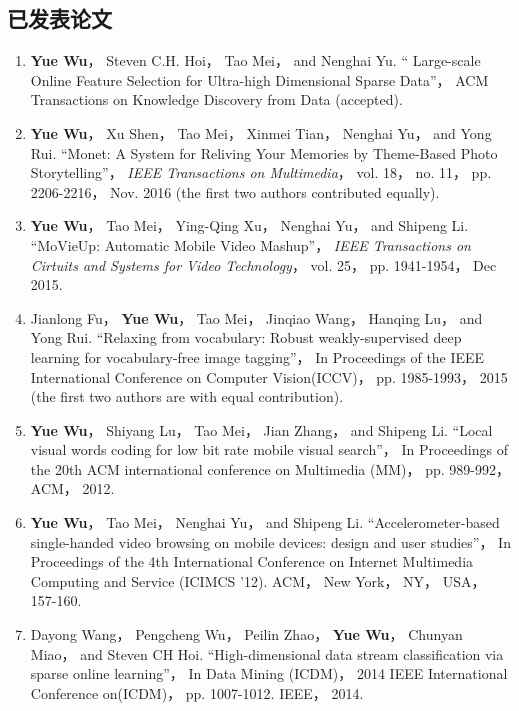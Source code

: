 \documentclass[doctor]{ustcthesis}
\begin{document}
\begin{publications}

    \section*{已发表论文}

    \begin{enumerate}
        \item \textbf{Yue Wu}， Steven C.H. Hoi， Tao Mei， and Nenghai Yu. ``
            Large-scale Online Feature Selection for Ultra-high Dimensional Sparse
            Data''， ACM Transactions on Knowledge Discovery from Data
            (accepted).
        \item \textbf{Yue Wu}， Xu Shen， Tao Mei， Xinmei Tian， Nenghai Yu， and Yong
            Rui. ``Monet: A System for Reliving Your Memories by Theme-Based Photo
            Storytelling''， \emph{IEEE Transactions on Multimedia}， vol. 18， no.
            11， pp. 2206-2216， Nov. 2016 (the first two authors contributed equally).
        \item \textbf{Yue Wu}， Tao Mei， Ying-Qing Xu， Nenghai Yu， and Shipeng Li.
            ``MoVieUp: Automatic Mobile Video Mashup''， \emph{IEEE Transactions on
            Cirtuits and Systems for Video Technology}， vol. 25， pp. 1941-1954， Dec
            2015.
        \item Jianlong Fu， \textbf{Yue Wu}， Tao Mei， Jinqiao Wang， Hanqing Lu， and
            Yong Rui. ``Relaxing from vocabulary: Robust weakly-supervised deep
            learning for vocabulary-free image tagging''， In Proceedings of the
            IEEE International Conference on Computer Vision(ICCV)， pp. 1985-1993，
            2015 (the first two authors are with equal contribution).
        \item \textbf{Yue Wu}， Shiyang Lu， Tao Mei， Jian Zhang， and Shipeng Li. ``Local visual
            words coding for low bit rate mobile visual search''， In Proceedings of
            the 20th ACM international conference on Multimedia (MM)， pp.  989-992，  ACM， 2012.
        \item \textbf{Yue Wu}， Tao Mei， Nenghai Yu， and Shipeng Li.
            ``Accelerometer-based single-handed video browsing on mobile devices:
            design and user studies''， In Proceedings of the 4th International
            Conference on Internet Multimedia Computing and Service (ICIMCS '12).
            ACM， New York， NY， USA， 157-160.
        \item Dayong Wang， Pengcheng Wu， Peilin Zhao， \textbf{Yue Wu}， Chunyan Miao， and
            Steven CH Hoi. ``High-dimensional data stream classification via sparse
            online learning''， In Data Mining (ICDM)， 2014 IEEE International
            Conference on(ICDM)， pp. 1007-1012. IEEE， 2014.
    \end{enumerate}


\end{publications}
\end{document}
